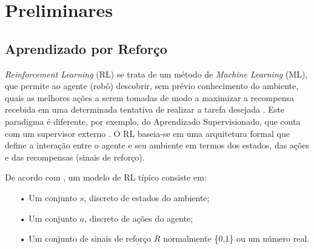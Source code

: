 \documentclass[a4paper]{ifacconf}
\begin{document}
\section{Preliminares}





\subsection{Aprendizado por Reforço}

\emph{Reinforcement Learning} (RL) se trata de um método de \emph{Machine Learning} (ML), que permite ao agente (robô) descobrir, sem prévio conhecimento do ambiente, quais as melhores ações a serem tomadas de modo a maximizar a recompensa recebida em uma determinada tentativa de realizar a tarefa desejada \citep{intro_to_rl}. Este paradigma é diferente, por exemplo, do Aprendizado Supervisionado, que conta com um supervisor externo \citep{intro_to_rl,rl_rob_survey,ql_pid_robotics,ql_model}. O RL baseia-se em uma arquitetura formal que define a interação entre o agente e seu ambiente em termos dos estados, das ações e das recompensas (sinais de reforço).

De acordo com \citep{intro_to_rl}, um modelo de RL típico consiste em:
\begin{itemize}
  \item[•] Um conjunto $s$, discreto de estados do ambiente;
  \item[•] Um conjunto $a$, discreto de ações do agente;
  \item[•] Um conjunto de sinais de reforço $R$ normalmente \{0,1\} ou um número real.
\end{itemize}
\end{document}

